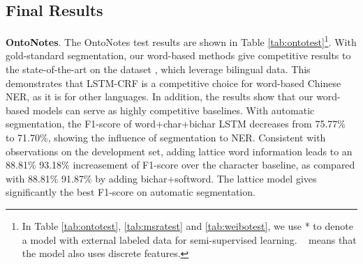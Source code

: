 \documentclass[11pt,a4paper]{article}
\begin{document}
\begin{CJK*}{UTF8}{gbsn}
\subsection{Final Results}
\textbf{OntoNotes}. The OntoNotes test results are shown in Table \ref{tab:ontotest}\footnote{In Table \ref{tab:ontotest}, \ref{tab:msratest} and \ref{tab:weibotest}, we use * to denote a model with external labeled data for semi-supervised learning. \dag ~ means that the model also uses discrete features.}. With gold-standard segmentation, our word-based methods give competitive results to the state-of-the-art on the dataset \cite{che2013named,wang2013effective}, which leverage bilingual data. This demonstrates that LSTM-CRF is a competitive choice for word-based Chinese NER, as it is for other languages. In addition, the results show that our word-based models can serve as highly competitive baselines. With automatic segmentation, the F1-score of word+char+bichar LSTM decreases from 75.77\% to 71.70\%, showing the influence of segmentation to NER. Consistent with observations on the development set, adding lattice word information leads to an 88.81\%  93.18\% increasement of F1-score over the character baseline, as compared with 88.81\%  91.87\% by adding bichar+softword. The lattice model gives significantly the best F1-score on automatic segmentation. 

\begin{table}[!tp]
\begin{center}
\end{center}
\caption{Main results on MSRA.}
\label{tab:msratest}
\end{table}


\end{CJK*}
\end{document}
